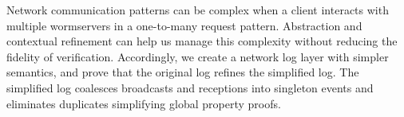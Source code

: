 





Network communication patterns can be complex when a client interacts with multiple wormservers in a one-to-many request pattern.
Abstraction and contextual refinement can help us manage this complexity without reducing the fidelity of verification.
Accordingly, we create a network log layer with simpler semantics, and prove that the original log refines the simplified log.
The simplified log coalesces broadcasts and receptions into singleton events and eliminates duplicates simplifying global property proofs.








